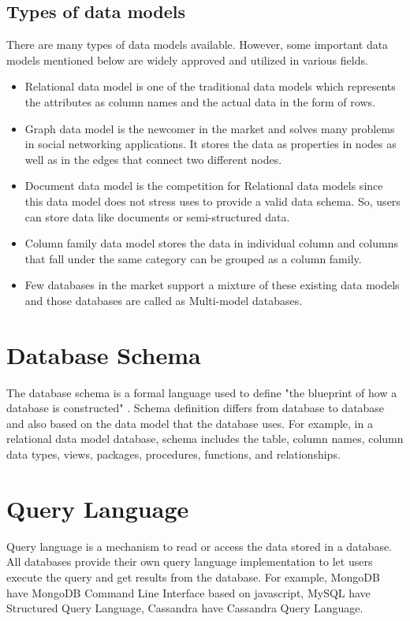     \subsection{Types of data models}
     There are many types of data models available. However, some important data models mentioned below are widely approved and utilized in various fields.
    \begin{itemize}
    	\item Relational data model is one of the traditional data models which represents the attributes as column names and the actual data in the form of rows.
    	\item Graph data model is the newcomer in the market and solves many problems in social networking applications. It stores the data as properties in nodes as well as in the edges that connect two different nodes.
    	\item Document data model is the competition for Relational data models since this data model does not stress uses to provide a valid data schema. So, users can store data like documents or semi-structured data. 
    	\item Column family data model stores the data in individual column and columns that fall under the same category can be grouped as a column family.  
    	\item Few databases in the market support a mixture of these existing data models and those databases are called as Multi-model databases.
    \end{itemize}
	
	\section{Database Schema}
	The database schema is a formal language used to define "the blueprint of how a database is constructed" \cite{misc09}. Schema definition differs from database to database and also based on the data model that the database uses. For example, in a relational data model database, schema includes the table, column names, column data types, views, packages, procedures, functions, and relationships. 

	\section{Query Language}
	Query language is a mechanism to read or access the data stored in a database.  All databases provide their own query language implementation to let users execute the query and get results from the database. For example, MongoDB have MongoDB Command Line Interface based on javascript, MySQL have Structured Query Language, Cassandra have Cassandra Query Language.
	
